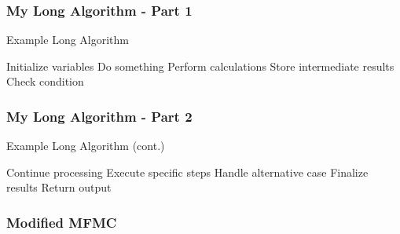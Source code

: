 \documentclass{beamer}
\begin{document}
\begin{frame}[t]
\begin{algorithm}[H]
Return $\widehat{\boldsymbol{\sigma}} \gets [\widehat{\sigma}_1,\ldots,\widehat{\sigma}_{K}]$, $\widehat{\boldsymbol{\alpha}} \gets [1,\widehat{\sigma}_2\ldots,\widehat{\sigma}_{K}]$, $\widehat{\boldsymbol{\rho}} \gets \widehat{\boldsymbol{\rho}}^{(Q)}$, $\widehat{\xi} \gets \widehat{\xi}^{(Q)}$, $\mathcal{I} \gets \mathcal{I}^{cur}$.

    \end{algorithmic}
    \caption{Dynamic Parameter Estimation}
    }
    \end{algorithm}

\end{frame}





\begin{frame}
\frametitle{My Long Algorithm - Part 1}
\begin{algorithm}[H]
    \caption{Example Long Algorithm}
    \begin{algorithmic}[1]
        \State Initialize variables
            \State Do something
            \State Perform calculations
            \State Store intermediate results
        \EndFor
        \State Check condition
    \end{algorithmic}
\end{algorithm}
\end{frame}

\begin{frame}
\frametitle{My Long Algorithm - Part 2}
\begin{algorithm}[H]
    \ContinuedFloat %
    \caption{Example Long Algorithm (cont.)}
    \begin{algorithmic}[1]
        \State Continue processing
            \State Execute specific steps
        \Else
            \State Handle alternative case
        \EndIf
        \State Finalize results
        \State Return output
    \end{algorithmic}
\end{algorithm}
\end{frame}



\begin{frame}[t]
    \frametitle{Modified MFMC}

\end{frame}
\end{document}
